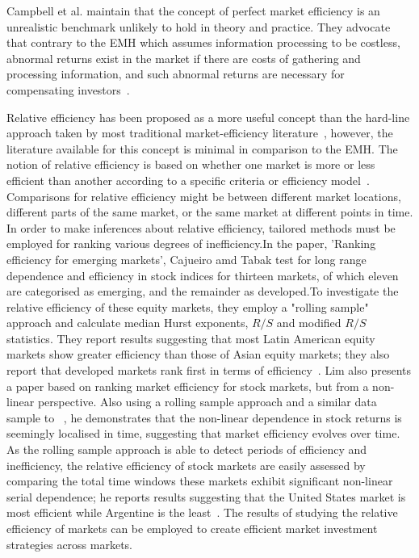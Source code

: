 \documentclass[13pt]{report}
\begin{document}
Campbell et al. maintain that the concept of perfect market efficiency is an unrealistic benchmark unlikely to hold in theory and practice. They advocate that contrary to the EMH which assumes information processing to be costless, abnormal returns exist in the market if there are costs of gathering and processing information, and such abnormal returns are necessary  for compensating investors~\cite{campbell1997econometrics}.\par

Relative efficiency has been proposed as a more useful concept than the hard-line approach taken by most traditional market-efficiency literature~\cite{campbell1997econometrics}, however, the literature available for this concept is minimal in comparison to the EMH. The notion of relative efficiency is based on whether one market is more or less efficient than another according to a specific criteria or efficiency model~\cite{bailey2005economics}. Comparisons for relative efficiency might be between different market locations, different parts of the same market, or the same market at different points in time. In order to make inferences about relative efficiency, tailored methods must be employed for ranking various degrees of inefficiency.In the paper, 'Ranking efficiency for emerging markets', Cajueiro amd Tabak test for long range dependence and efficiency in stock indices for thirteen markets, of which eleven are categorised as emerging, and the remainder as developed.To investigate the relative efficiency of these equity markets, they employ a "rolling sample" approach and calculate median Hurst exponents, $R/S$ and modified $R/S$ statistics. They report results suggesting that most Latin American equity markets show greater efficiency than those of Asian equity markets; they also report that developed markets rank first in terms of efficiency~\cite{efficiencycajueiro2004ranking}. Lim also presents a paper based on ranking market efficiency for stock markets, but from a non-linear perspective. Also using a rolling sample approach and a similar data sample to~\cite{efficiencycajueiro2004ranking} , he demonstrates that the non-linear dependence in stock returns is seemingly localised in time, suggesting that market efficiency evolves over time. As the rolling sample approach is able to detect periods of efficiency and inefficiency, the relative efficiency of stock markets are easily assessed by comparing the total time windows these markets exhibit significant non-linear serial dependence; he reports results suggesting that the United States market is most efficient while Argentine is the least~\cite{efficientlim2007ranking}. The results of studying the relative efficiency of markets can be employed to create efficient market investment strategies across markets. 
\end{document}
